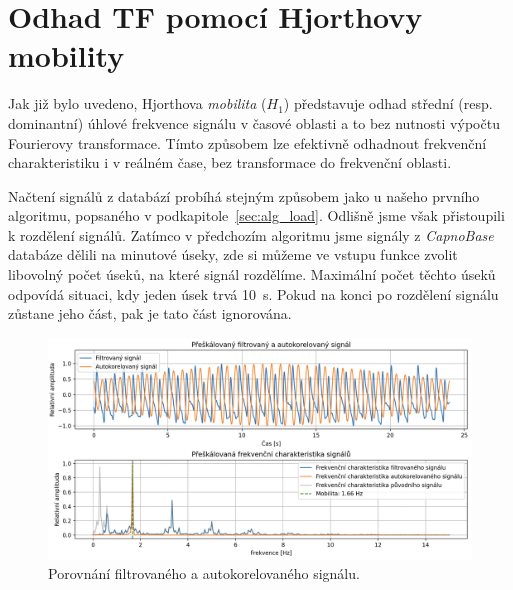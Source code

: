 \section{Odhad TF pomocí Hjorthovy mobility}
\label{sec:hjorth_mobilita_tf}
Jak již bylo uvedeno, Hjorthova \textit{mobilita} (\( H_1 \)) představuje odhad střední (resp. dominantní) úhlové frekvence signálu v časové oblasti a to bez nutnosti výpočtu Fourierovy transformace.
Tímto způsobem lze efektivně odhadnout frekvenční charakteristiku i v reálném čase, bez transformace do frekvenční oblasti.

Načtení signálů z databází probíhá stejným způsobem jako u našeho prvního algoritmu, popsaného v podkapitole~\ref{sec:alg_load}.
Odlišně jsme však přistoupili k rozdělení signálů.
Zatímco v předchozím algoritmu jsme signály z \textit{CapnoBase} databáze dělili na minutové úseky, zde si můžeme ve vstupu funkce zvolit libovolný počet úseků, na které signál rozdělíme.
Maximální počet těchto úseků odpovídá situaci, kdy jeden úsek trvá 10~s.
Pokud na konci po rozdělení signálu zůstane jeho část, pak je tato část ignorována.

\begin{figure}[t]
	\centering
	\includegraphics[width=1\textwidth]{./obrazky/hjorth_autocorr_freq.png}
	\caption[Porovnání filtrovaného a autokorelovaného signálu]{Porovnání filtrovaného a autokorelovaného signálu.}
	\label{fig:hjorth_autocorr}
\end{figure}

